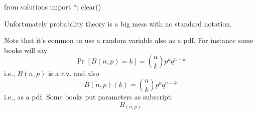 \begin{python0}
from solutions import *; clear()
\end{python0}

Unfortunately probability theory is a big mess with no
standard notation.

Note that it's common to use a random variable also as a pdf.
For instance some books will say
\[
\Pr[B(n,p) = k] = \binom{n}{k} p^kq^{n-k}
\]
i.e., $B(n,p)$ is a r.v.
and also
\[
B(n,p)(k) = \binom{n}{k} p^kq^{n-k}
\]
i.e., as a pdf.
Some books put parameters as subscript:
\[
B_{(n,p)}
\]



